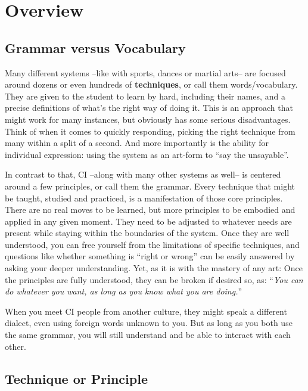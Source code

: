 \section{Overview}\label{sec:overview}

\subsection{Grammar versus Vocabulary}\label{subsec:grammar-versus-vocabulary}

Many different systems --like with sports, dances or martial arts-- are focused around dozens or even hundreds of \textbf{techniques}, or call them words/vocabulary.
They are given to the student to learn by hard, including their names, and a precise definitions of what's the right way of doing it.
This is an approach that might work for many instances, but obviously has some serious disadvantages.
Think of when it comes to quickly responding, picking the right technique from many within a split of a second.
And more importantly is the ability for individual expression: using the system as an art-form to ``say the unsayable''.

In contrast to that, CI --along with many other systems as well-- is centered around a few principles, or call them the grammar.
Every technique that might be taught, studied and practiced, is a manifestation of those core principles.
There are no real moves to be learned, but more principles to be embodied and applied in any given moment.
They need to be adjusted to whatever needs are present while staying within the boundaries of the system.
Once they are well understood, you can free yourself from the limitations of specific techniques, and questions like whether something is ``right or wrong'' can be easily answered by asking your deeper understanding.
Yet, as it is with the mastery of any art: Once the principles are fully understood, they can be broken if desired so, as: ``\textit{You can do whatever you want, as long as you know what you are doing.}''

When you meet CI people from another culture, they might speak a different dialect, even using foreign words unknown to you.
But as long as you both use the same grammar, you will still understand and be able to interact with each other.

\subsection{Technique or Principle}\label{subsec:technique-or-principle} %

